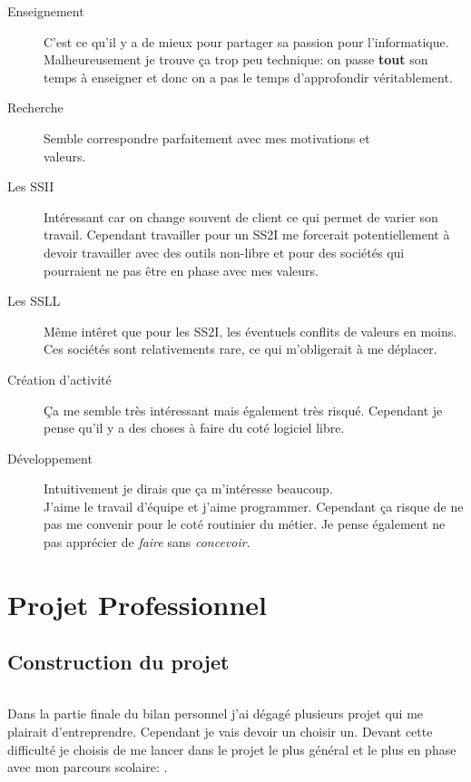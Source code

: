 \documentclass[a4paper,12pt, draft]{report}
\newcommand{\tabTitle}[1]{\hfill{} \textsc{#1} \hfill{} }
\begin{document}
\begin{description}
\item [Enseignement] C'est ce qu'il y a de mieux pour partager sa passion pour l'informatique. Malheureusement je trouve ça trop peu technique: on passe \textbf{tout} son temps à enseigner et donc on a pas le temps d'approfondir véritablement.

\item [Recherche] Semble correspondre parfaitement avec mes motivations et\\ valeurs.

\item [Les SSII] Intéressant car on change souvent de client ce qui permet de varier son travail. Cependant travailler pour un SS2I me forcerait potentiellement à devoir travailler avec des outils non-libre et pour des sociétés qui pourraient ne pas être en phase avec mes valeurs.

\item [Les SSLL] Même intêret que pour les SS2I, les éventuels conflits de valeurs en moins. Ces sociétés sont relativements rare\cite{annuaire_ssll}, ce qui m'obligerait à me déplacer.
 
\item [Création d'activité] Ça me semble très intéressant mais également très risqué. Cependant je pense qu'il y a des choses à faire du coté logiciel libre.

\item [Développement] Intuitivement je dirais que ça m'intéresse beaucoup. \\J'aime le travail d'équipe et j'aime programmer. Cependant ça risque de ne pas me convenir pour le coté routinier du métier. Je pense également ne pas apprécier de \textit{faire} sans \textit{concevoir}.
\end{description}


\part{Projet Professionnel}

\chapter{Construction du projet}
\paragraph{}
Dans la partie finale du bilan personnel j'ai dégagé plusieurs projet qui me plairait d'entreprendre. Cependant je vais devoir un choisir un. Devant cette difficulté je choisis de me lancer dans le projet le plus général et le plus en phase avec mon parcours scolaire: \tabTitle{}. \\
\end{document}
